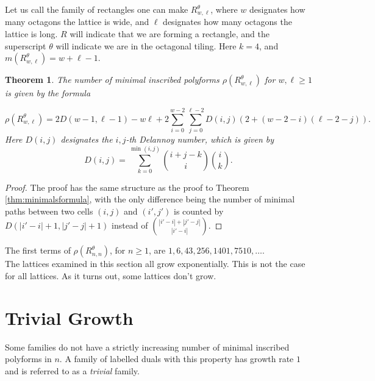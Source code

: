 \documentclass[12pt]{article}
\newtheorem{theorem}{Theorem}
\theoremstyle{plain}
\theoremstyle{definition}
\theoremstyle{remark}
\theoremstyle{definition}
\begin{document}
Let us call the family of rectangles one can make $R^{\theta}_{w,\ell}$, where $w$ designates how many octagons the lattice is wide, and $\ell$ designates how many octagons the lattice is long. $R$ will indicate that we are forming a rectangle, and the superscript $\theta$ will indicate we are in the octagonal tiling. Here $k=4$, and $m(R^{\theta}_{w,\ell}) = w + \ell - 1$. 

\begin{theorem}\label{thm:octagonal}
The number of minimal inscribed polyforms $\rho(R^{\theta}_{w,\ell})$ for $w,\ell \geq 1$ is given by the formula

\begin{equation}
    \rho(R^{\theta}_{w,\ell}) = 2D(w-1,\ell-1) - w\ell +2 \sum_{i=0}^{w-2}\sum_{j=0}^{\ell-2}D(i,j)(2+(w-2-i)(\ell-2-j)).
\end{equation}
Here $D(i,j)$ designates the $i,j$-th Delannoy number, which is given by 
$$D(i,j) = \sum_{k=0}^{\min (i,j)} \binom{i+j-k}{i} \binom{i}{k}.$$
\end{theorem}

\begin{proof}

The proof has the same structure as the proof to Theorem \ref{thm:minimalsformula}, with the only difference being the number of minimal paths between two cells $(i,j)$ and $(i',j')$ is counted by $D(|i'-i|+1,|j'-j|+1)$ instead of $\binom{|i'-i|+|j'-j|}{|i'-i|}$.

\end{proof}

The first terms of $\rho(R^{\theta}_{n,n})$, for $n \geq 1$, are $1, 6, 43, 256, 1401, 7510, \dots$. \\

The lattices examined in this section all grow exponentially. This is not the case for all lattices. As it turns out, some lattices don't grow.

\section{Trivial Growth}\label{sec:trivial}
Some families do not have a strictly increasing number of minimal inscribed polyforms in $n$. A family of labelled duals with this property has growth rate $1$ and is referred to as a \textit{trivial} family.
\end{document}
